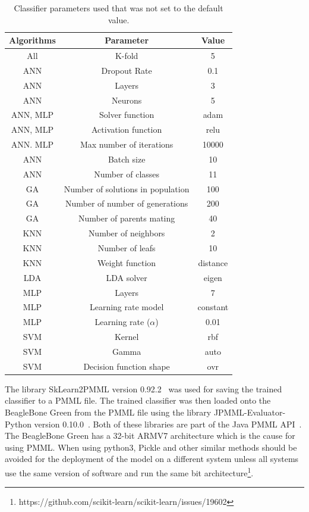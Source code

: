 \begin{table}[ht]
    \centering
    \begin{tabular}{c|c|c}
        Algorithms & Parameter & Value \\ \hline
        All & K-fold & 5 \\
        ANN & Dropout Rate & 0.1 \\
        ANN & Layers & 3 \\
        ANN & Neurons & 5 \\
        ANN, MLP & Solver function & adam \\
        ANN, MLP & Activation function & relu \\
        ANN. MLP & Max number of iterations & 10000 \\
        ANN & Batch size & 10 \\
        ANN & Number of classes & 11 \\
        GA & Number of solutions in population & 100 \\
        GA & Number of number of generations & 200 \\
        GA & Number of parents mating & 40 \\
        KNN & Number of neighbors & 2 \\
        KNN & Number of leafs & 10 \\
        KNN & Weight function & distance \\
        LDA & LDA solver & eigen \\
        MLP & Layers & 7 \\
        MLP & Learning rate model & constant \\
        MLP & Learning rate ($\alpha$) & 0.01 \\
        SVM & Kernel & rbf \\
        SVM & Gamma & auto \\
        SVM & Decision function shape & ovr                      
    \end{tabular}
    \caption{Classifier parameters used that was not set to the default value.}
    \label{tab:classifier_parameters}
\end{table}

The library SkLearn2PMML version 0.92.2~\cite{ruusmannSkLearn2PMML2023}
was used for saving the trained classifier to a PMML file. The trained classifier was then loaded onto the BeagleBone Green from the PMML file using the library JPMML-Evaluator-Python version 0.10.0~\cite{ruusmannJPMMLEvaluatorPython2023}. %
Both of these libraries are part of the Java PMML API~\cite{ruusmannJavaPMMLAPI2023}.
The BeagleBone Green has a 32-bit ARMV7 architecture which is the cause for using PMML. When using python3, Pickle and other similar methods should be avoided for the deployment of the model on a different system unless all systems use the same version of software and run the same bit architecture\footnote{https://github.com/scikit-learn/scikit-learn/issues/19602}.




